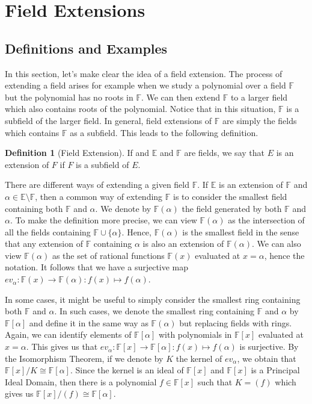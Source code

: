 \documentclass{article}
\theoremstyle{plain}
\theoremstyle{definition}
\newtheorem*{definition}{Definition}
\newcommand{\F}{\mathbb{F}}
\newcommand{\E}{\mathbb{E}}
\newcommand{\isomorphic}{\cong}
\begin{document}
\section{Field Extensions}

\subsection{Definitions and Examples}

In this section, let's make clear the idea of a field extension. The process of extending a field arises for example when we study a polynomial over a field $\F$ but the polynomial has no roots in $\F$. We can then extend $\F$ to a larger field which also contains roots of the polynomial. Notice that in this situation, $\F$ is a subfield of the larger field. In general, field extensions of $\F$ are simply the fields which contains $\F$ as a subfield. This leads to the following definition.

\begin{definition}[Field Extension]
    If and $\E$ and $\F$ are fields, we say that $E$ is an extension of $F$ if $F$ is a subfield of $E$.
\end{definition}

There are different ways of extending a given field $\F$. If $\E$ is an extension of $\F$ and $\alpha \in \E \setminus \F$, then a common way of extending $\F$ is to consider the smallest field containing both $\F$ and $\alpha$. We denote by $\F(\alpha)$ the field generated by both $\F$ and $\alpha$. To make the definition more precise, we can view $\F(\alpha)$ as the intersection of all the fields containing $\F \cup \{ \alpha\}$. Hence, $\F(\alpha)$ is the smallest field in the sense that any extension of $\F$ containing $\alpha$ is also an extension of $\F(\alpha)$. We can also view $\F(\alpha)$ as the set of rational functions $\F(x)$ evaluated at $x = \alpha$, hence the notation. It follows that we have a surjective map $ev_{\alpha} : \F(x) \to \F(\alpha) : f(x) \mapsto f(\alpha)$.

In some cases, it might be useful to simply consider the smallest ring containing both $\F$ and $\alpha$. In such cases, we denote the smallest ring containing $\F$ and $\alpha$ by $\F[\alpha]$ and define it in the same way as $\F(\alpha)$ but replacing fields with rings. Again, we can identify elements of $\F[\alpha]$ with polynomials in $\F[x]$ evaluated at $x = \alpha$. This gives us that $ev_{\alpha} : \F[x] \to \F[\alpha] : f(x) \mapsto f(\alpha)$ is surjective. By the Isomorphism Theorem, if we denote by $K$ the kernel of $ev_{\alpha}$, we obtain that $\F[x]/K \isomorphic \F[\alpha]$. Since the kernel is an ideal of $\F[x]$ and $\F[x]$ is a Principal Ideal Domain, then there is a polynomial $f \in \F[x]$ such that $K = (f)$ which gives us $\F[x] / (f) \isomorphic \F[\alpha]$.
\end{document}
